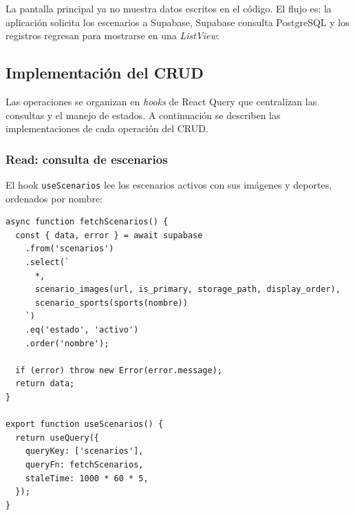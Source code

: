 La pantalla principal ya no muestra datos escritos en el c\'odigo. El
flujo es: la aplicaci\'on solicita los escenarios a Supabase, Supabase
consulta PostgreSQL y los registros regresan para mostrarse en una
\textit{ListView}:

\begin{figure}[H]
\centering
\end{figure}

\subsection{Implementaci\'on del CRUD}

Las operaciones se organizan en \textit{hooks} de React Query que
centralizan las consultas y el manejo de estados. A continuaci\'on se
describen las implementaciones de cada operaci\'on del CRUD.

\subsubsection{Read: consulta de escenarios}

El hook \texttt{useScenarios} lee los escenarios activos con sus im\'agenes
y deportes, ordenados por nombre:

\begin{lstlisting}
async function fetchScenarios() {
  const { data, error } = await supabase
    .from('scenarios')
    .select(`
      *,
      scenario_images(url, is_primary, storage_path, display_order),
      scenario_sports(sports(nombre))
    `)
    .eq('estado', 'activo')
    .order('nombre');

  if (error) throw new Error(error.message);
  return data;
}

export function useScenarios() {
  return useQuery({
    queryKey: ['scenarios'],
    queryFn: fetchScenarios,
    staleTime: 1000 * 60 * 5,
  });
}
\end{lstlisting}

